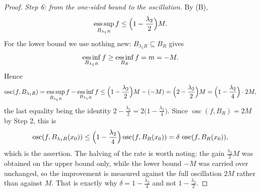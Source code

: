 \begin{proof}
\emph{Step 6: from the one-sided bound to the oscillation.}  By (B),
\[
\operatorname*{ess\,sup}_{B_{\lambda_1R}}f\le\Bigl(1-\frac{\lambda_2}2\Bigr)M .
\]
For the lower bound we use nothing new: $B_{\lambda_1R}\subseteq B_R$ gives
\[
\operatorname*{ess\,inf}_{B_{\lambda_1R}}f\ge\operatorname*{ess\,inf}_{B_R}f=m=-M .
\]
Hence
\[
\operatorname*{osc}(f,B_{\lambda_1R})
=\operatorname*{ess\,sup}_{B_{\lambda_1R}}f-\operatorname*{ess\,inf}_{B_{\lambda_1R}}f
\le\Bigl(1-\frac{\lambda_2}2\Bigr)M-(-M)
=\Bigl(2-\frac{\lambda_2}2\Bigr)M
=\Bigl(1-\frac{\lambda_2}4\Bigr)\cdot2M ,
\]
the last equality being the identity
$2-\frac{\lambda_2}2=2\bigl(1-\frac{\lambda_2}4\bigr)$.  Since
$\operatorname*{osc}(f,B_R)=2M$ by Step 2, this is
\[
\operatorname*{osc}(f,B_{\lambda_1R}(x_0))
\le\Bigl(1-\frac{\lambda_2}4\Bigr)\operatorname*{osc}(f,B_R(x_0))
=\delta\,\operatorname*{osc}(f,B_R(x_0)) ,
\]
which is the assertion.  The halving of the rate is worth noting: the gain
$\frac{\lambda_2}2M$ was obtained on the upper bound only, while the lower bound
$-M$ was carried over unchanged, so the improvement is measured against the full
oscillation $2M$ rather than against $M$.  That is exactly why
$\delta=1-\frac{\lambda_2}4$ and not $1-\frac{\lambda_2}2$.
\end{proof}
